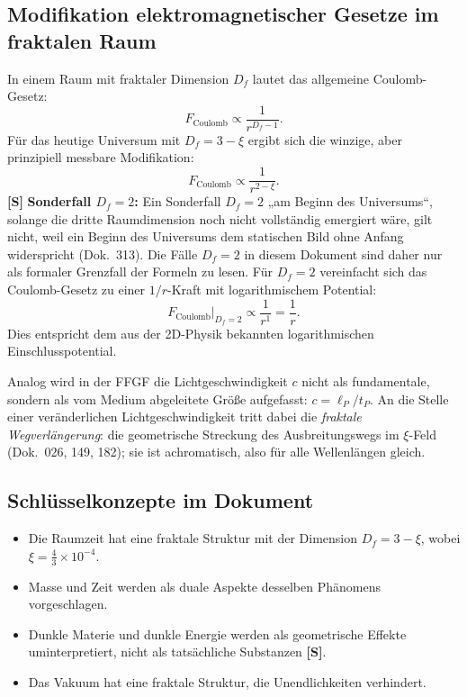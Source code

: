 	\subsection{Modifikation elektromagnetischer Gesetze im fraktalen Raum}
	In einem Raum mit fraktaler Dimension \(D_f\) lautet das allgemeine Coulomb-Gesetz:
	\begin{equation}
		F_{\text{Coulomb}} \propto \frac{1}{r^{D_f - 1}}.
		\label{eq:fractal_coulomb_general}
	\end{equation}
	Für das heutige Universum mit \(D_f = 3-\xi\) ergibt sich die winzige, aber prinzipiell messbare Modifikation:
	\begin{equation}
		F_{\text{Coulomb}} \propto \frac{1}{r^{2 - \xi}}.
		\label{eq:fractal_coulomb}
	\end{equation}
	\textbf{[S]} \textbf{Sonderfall \(D_f = 2\):}
	Ein Sonderfall \(D_f = 2\) „am Beginn des Universums“, solange die dritte Raumdimension noch nicht vollständig emergiert wäre, gilt nicht, weil ein Beginn des Universums dem statischen Bild ohne Anfang widerspricht (Dok.~313). Die Fälle \(D_f = 2\) in diesem Dokument sind daher nur als formaler Grenzfall der Formeln zu lesen. Für \(D_f = 2\) vereinfacht sich das Coulomb-Gesetz zu einer $1/r$-Kraft mit logarithmischem Potential:
	\begin{equation}
		F_{\text{Coulomb}}\big|_{D_f=2} \propto \frac{1}{r^{1}} = \frac{1}{r}.
		\label{eq:coulomb_df2}
	\end{equation}
	Dies entspricht dem aus der 2D-Physik bekannten logarithmischen Einschlusspotential.

	Analog wird in der FFGF die Lichtgeschwindigkeit \(c\) nicht als fundamentale, sondern als vom Medium abgeleitete Größe aufgefasst: \(c = \ell_P / t_P\). An die Stelle einer veränderlichen Lichtgeschwindigkeit tritt dabei die \emph{fraktale Wegverlängerung}: die geometrische Streckung des Ausbreitungswegs im $\xi$-Feld (Dok.~026, 149, 182); sie ist achromatisch, also für alle Wellenlängen gleich.
	
	\subsection{Schlüsselkonzepte im Dokument}
	\begin{itemize}
		\item Die Raumzeit hat eine fraktale Struktur mit der Dimension \( D_f = 3 - \xi \), wobei \( \xi = \frac{4}{3} \times 10^{-4} \).
		\item Masse und Zeit werden als duale Aspekte desselben Phänomens vorgeschlagen.
		\item Dunkle Materie und dunkle Energie werden als geometrische Effekte uminterpretiert, nicht als tatsächliche Substanzen \textbf{[S]}.
		\item Das Vakuum hat eine fraktale Struktur, die Unendlichkeiten verhindert.
	\end{itemize}
	
